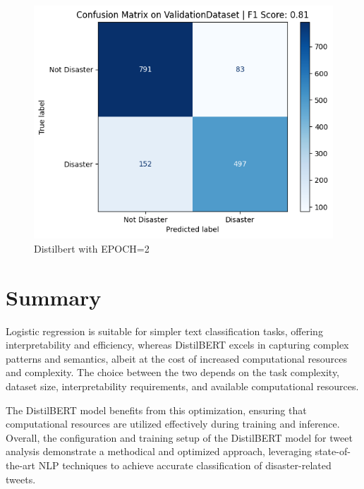 \begin{figure}[H]
    \centering
    \includegraphics[scale=0.7]{figures/epoch2_validation.png}
    \caption{Distilbert with EPOCH=2}
\end{figure}





\newpage
\section{Summary}
Logistic regression is suitable for simpler text classification tasks, offering interpretability and efficiency, whereas DistilBERT excels in capturing complex patterns and semantics, albeit at the cost of increased computational resources and complexity. The choice between the two depends on the task complexity, dataset size, interpretability requirements, and available computational resources.

The DistilBERT model benefits from this optimization, ensuring that computational resources are utilized effectively during training and inference.
Overall, the configuration and training setup of the DistilBERT model for tweet analysis demonstrate a methodical and optimized approach, leveraging state-of-the-art NLP techniques to achieve accurate classification of disaster-related tweets.



